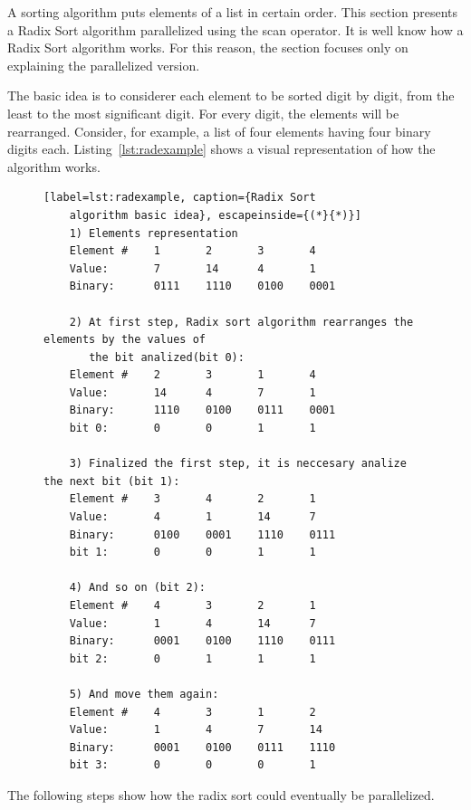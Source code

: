 \documentclass[Ingles]{ic-tese-v1}
\newcommand{\rlst}[1]{Listing~\ref{lst:#1}}
\begin{document}
A sorting algorithm puts elements of a list in certain order. This section
presents a Radix Sort algorithm parallelized using the scan operator. It is
well know how a Radix Sort algorithm works.  For this reason, the section
focuses only on explaining the parallelized version.

The basic idea is to considerer each element to be sorted digit by digit, from
the least to the most significant digit. For every digit, the elements will be rearranged.
Consider, for example, a list of four elements having four binary digits each.
\rlst{radexample} shows a visual representation of how the
algorithm works.

\begin{figure}[t]
	\lstset{basicstyle=\scriptsize}
	\begin{lstlisting}[label=lst:radexample, caption={Radix Sort
	algorithm basic idea}, escapeinside={(*}{*)}]
	1) Elements representation
	Element #    1       2       3       4
	Value:       7       14      4       1
	Binary:      0111    1110    0100    0001

	2) At first step, Radix sort algorithm rearranges the elements by the values of
	   the bit analized(bit 0):
	Element #    2       3       1       4
	Value:       14      4       7       1
	Binary:      1110    0100    0111    0001
	bit 0:       0       0       1       1

	3) Finalized the first step, it is neccesary analize the next bit (bit 1):
	Element #    3       4       2       1
	Value:       4       1       14      7
	Binary:      0100    0001    1110    0111
	bit 1:       0       0       1       1

	4) And so on (bit 2):
	Element #    4       3       2       1
	Value:       1       4       14      7
	Binary:      0001    0100    1110    0111
	bit 2:       0       1       1       1

	5) And move them again:
	Element #    4       3       1       2
	Value:       1       4       7       14
	Binary:      0001    0100    0111    1110
	bit 3:       0       0       0       1

	\end{lstlisting}
\end{figure}

The following steps show how the radix sort could eventually be parallelized.
\end{document}
